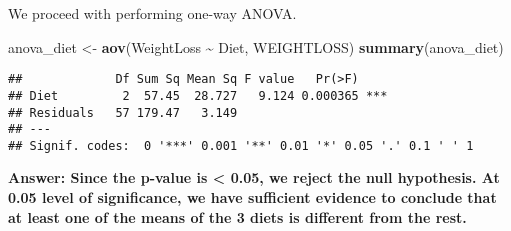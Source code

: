 \documentclass[
]{article}
\newenvironment{Shaded}{\begin{snugshade}}{\end{snugshade}}
\newcommand{\FunctionTok}[1]{\textcolor[rgb]{0.13,0.29,0.53}{\textbf{#1}}}
\newcommand{\NormalTok}[1]{#1}
\newcommand{\OtherTok}[1]{\textcolor[rgb]{0.56,0.35,0.01}{#1}}
\newcommand{\SpecialCharTok}[1]{\textcolor[rgb]{0.81,0.36,0.00}{\textbf{#1}}}
\begin{document}
We proceed with performing one-way ANOVA.

\begin{Shaded}
\begin{Highlighting}[]
\NormalTok{anova\_diet }\OtherTok{\textless{}{-}} \FunctionTok{aov}\NormalTok{(WeightLoss }\SpecialCharTok{\textasciitilde{}}\NormalTok{ Diet, WEIGHTLOSS)}
\FunctionTok{summary}\NormalTok{(anova\_diet)}
\end{Highlighting}
\end{Shaded}

\begin{verbatim}
##             Df Sum Sq Mean Sq F value   Pr(>F)    
## Diet         2  57.45  28.727   9.124 0.000365 ***
## Residuals   57 179.47   3.149                     
## ---
## Signif. codes:  0 '***' 0.001 '**' 0.01 '*' 0.05 '.' 0.1 ' ' 1
\end{verbatim}

\textbf{Answer: Since the p-value is \textless{} 0.05, we reject the
null hypothesis. At 0.05 level of significance, we have sufficient
evidence to conclude that at least one of the means of the 3 diets is
different from the rest.}
\end{document}
